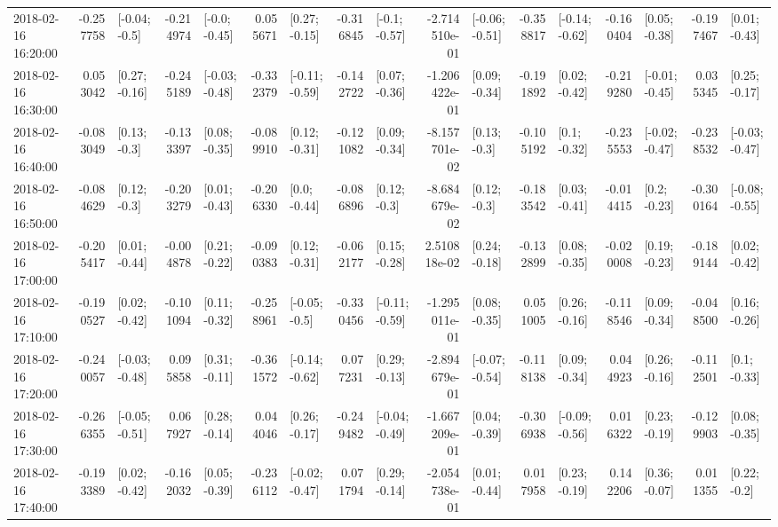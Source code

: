 \begin{tabular}{lrlrlrlrlrlrlrlrl}
2018-02-16 16:20:00 & -0.257758 &   [-0.04; -0.5] & -0.214974 &   [-0.0; -0.45] &  0.055671 &   [0.27; -0.15] & -0.316845 &   [-0.1; -0.57] & -2.714510e-01 &  [-0.06; -0.51] & -0.358817 &  [-0.14; -0.62] & -0.160404 &   [0.05; -0.38] & -0.197467 &   [0.01; -0.43] \\
2018-02-16 16:30:00 &  0.053042 &   [0.27; -0.16] & -0.245189 &  [-0.03; -0.48] & -0.332379 &  [-0.11; -0.59] & -0.142722 &   [0.07; -0.36] & -1.206422e-01 &   [0.09; -0.34] & -0.191892 &   [0.02; -0.42] & -0.219280 &  [-0.01; -0.45] &  0.035345 &   [0.25; -0.17] \\
2018-02-16 16:40:00 & -0.083049 &    [0.13; -0.3] & -0.133397 &   [0.08; -0.35] & -0.089910 &   [0.12; -0.31] & -0.121082 &   [0.09; -0.34] & -8.157701e-02 &    [0.13; -0.3] & -0.105192 &    [0.1; -0.32] & -0.235553 &  [-0.02; -0.47] & -0.238532 &  [-0.03; -0.47] \\
2018-02-16 16:50:00 & -0.084629 &    [0.12; -0.3] & -0.203279 &   [0.01; -0.43] & -0.206330 &    [0.0; -0.44] & -0.086896 &    [0.12; -0.3] & -8.684679e-02 &    [0.12; -0.3] & -0.183542 &   [0.03; -0.41] & -0.014415 &    [0.2; -0.23] & -0.300164 &  [-0.08; -0.55] \\
2018-02-16 17:00:00 & -0.205417 &   [0.01; -0.44] & -0.004878 &   [0.21; -0.22] & -0.090383 &   [0.12; -0.31] & -0.062177 &   [0.15; -0.28] &  2.510818e-02 &   [0.24; -0.18] & -0.132899 &   [0.08; -0.35] & -0.020008 &   [0.19; -0.23] & -0.189144 &   [0.02; -0.42] \\
2018-02-16 17:10:00 & -0.190527 &   [0.02; -0.42] & -0.101094 &   [0.11; -0.32] & -0.258961 &   [-0.05; -0.5] & -0.330456 &  [-0.11; -0.59] & -1.295011e-01 &   [0.08; -0.35] &  0.051005 &   [0.26; -0.16] & -0.118546 &   [0.09; -0.34] & -0.048500 &   [0.16; -0.26] \\
2018-02-16 17:20:00 & -0.240057 &  [-0.03; -0.48] &  0.095858 &   [0.31; -0.11] & -0.361572 &  [-0.14; -0.62] &  0.077231 &   [0.29; -0.13] & -2.894679e-01 &  [-0.07; -0.54] & -0.118138 &   [0.09; -0.34] &  0.044923 &   [0.26; -0.16] & -0.112501 &    [0.1; -0.33] \\
2018-02-16 17:30:00 & -0.266355 &  [-0.05; -0.51] &  0.067927 &   [0.28; -0.14] &  0.044046 &   [0.26; -0.17] & -0.249482 &  [-0.04; -0.49] & -1.667209e-01 &   [0.04; -0.39] & -0.306938 &  [-0.09; -0.56] &  0.016322 &   [0.23; -0.19] & -0.129903 &   [0.08; -0.35] \\
2018-02-16 17:40:00 & -0.193389 &   [0.02; -0.42] & -0.162032 &   [0.05; -0.39] & -0.236112 &  [-0.02; -0.47] &  0.071794 &   [0.29; -0.14] & -2.054738e-01 &   [0.01; -0.44] &  0.017958 &   [0.23; -0.19] &  0.142206 &   [0.36; -0.07] &  0.011355 &    [0.22; -0.2] \\

\end{tabular}
